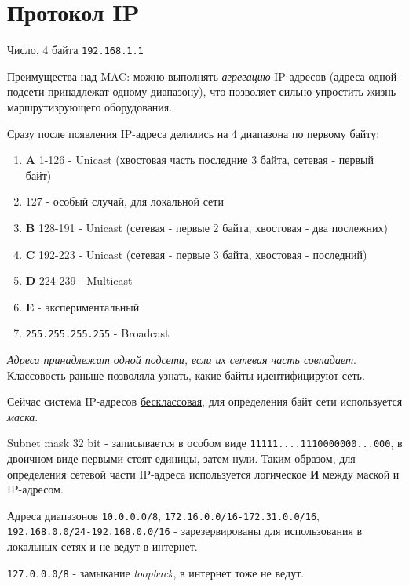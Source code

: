 \documentclass[a4paper,10pt]{article}
\begin{document}
	\section{Протокол IP}
	Число, 4 байта \texttt{192.168.1.1}
	
	Преимущества над MAC: можно выполнять \emph{агрегацию} IP-адресов (адреса одной подсети принадлежат одному диапазону), что позволяет сильно упростить жизнь маршрутизрующего оборудования.
	
	Сразу после появления IP-адреса делились на 4 диапазона по первому байту:
	\begin{enumerate}
		\item \textbf{A} 1-126 - Unicast (хвостовая часть последние 3 байта, сетевая - первый байт)\
		\item 127 - особый случай, для локальной сети
		\item \textbf{B} 128-191 - Unicast (сетевая - первые 2 байта, хвостовая - два послежних)
		\item \textbf{C} 192-223 - Unicast (сетевая - первые 3 байта, хвостовая - последний)
		\item \textbf{D} 224-239 - Multicast
		\item \textbf{E} - экспериментальный
		\item \texttt{255.255.255.255} - Broadcast
	\end{enumerate}
	\emph{Адреса принадлежат одной подсети, если их сетевая часть совпадает}. Классовость раньше позволяла узнать, какие байты идентифицируют сеть.
	
	Сейчас система IP-адресов \underline{бесклассовая}, для определения байт сети используется \emph{маска}. 
	
	Subnet mask 32 bit - записывается в особом виде \texttt{11111....1110000000...000}, в двоичном виде первыми стоят единицы, затем нули. Таким образом, для определения сетевой части IP-адреса используется логическое \textbf{И} между маской и IP-адресом.
	
	Адреса диапазонов \texttt{10.0.0.0/8}, \texttt{172.16.0.0/16-172.31.0.0/16}, \texttt{192.168.0.0/24-192.168.0.0/16} - зарезервированы для использования в локальных сетях и не ведут в интернет.
	
	\texttt{127.0.0.0/8} - замыкание \emph{loopback}, в интернет тоже не ведут.
\end{document}
